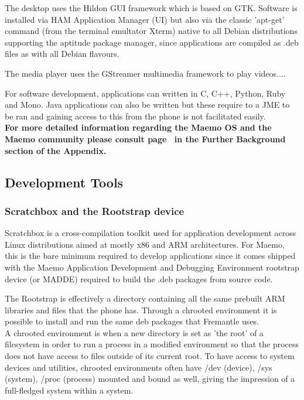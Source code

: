 The desktop uses the Hildon GUI framework which is based on GTK. Software is installed via HAM Application Manager (UI) but also via the classic 'apt-get' command (from the terminal emultator Xterm) native to all Debian distributions supporting the aptitude package manager, since applications are compiled as .deb files as with all Debian flavours.

The media player uses the GStreamer multimedia framework to play videos....

For software development, applications can written in C, C++, Python, Ruby and Mono. Java applications can also be written but these require to a JME to be ran and gaining access to this from the phone is not facilitated easily.\\

{\small\bf For more detailed information regarding the Maemo OS and the Maemo community please consult page~\pageref{maemocomm} in the Further Background section of the Appendix.}

\subsection{Development Tools}
\subsubsection{Scratchbox and the Rootstrap device}
Scratchbox is a cross-compilation toolkit used for application development across Linux distributions aimed at mostly x86 and ARM architectures. For Maemo, this is the bare minimum required to develop applications since it comes shipped with the Maemo Application Development and Debugging Environment rootstrap device (or MADDE) required to build the .deb packages from source code.

The Rootstrap is effectively a directory containing all the same prebuilt ARM libraries and files that the phone has. Through a chrooted environment it is possible to install and run the same deb packages that Fremantle uses. \\A chrooted environment is when a new directory is set as 'the root' of a filesystem in order to run a process in a modified environment so that the process does not have access to files outside of its current root. To have access to system devices and utilities, chrooted environments often have  /dev (device), /sys (system), /proc (process) mounted and bound as well, giving the impression of a full-fledged system within a system.

